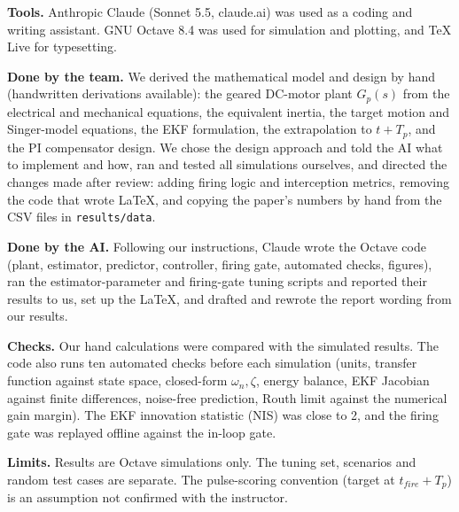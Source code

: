\small
\textbf{Tools.} Anthropic Claude (Sonnet 5.5, claude.ai) was used as a coding and writing assistant. GNU Octave 8.4 was used for simulation and plotting, and TeX Live for typesetting.

\textbf{Done by the team.} We derived the mathematical model and design by hand (handwritten derivations available): the geared DC-motor plant $G_p(s)$ from the electrical and mechanical equations, the equivalent inertia, the target motion and Singer-model equations, the EKF formulation, the extrapolation to $t+T_p$, and the PI compensator design. We chose the design approach and told the AI what to implement and how, ran and tested all simulations ourselves, and directed the changes made after review: adding firing logic and interception metrics, removing the code that wrote LaTeX, and copying the paper's numbers by hand from the CSV files in \texttt{results/data}.

\textbf{Done by the AI.} Following our instructions, Claude wrote the Octave code (plant, estimator, predictor, controller, firing gate, automated checks, figures), ran the estimator-parameter and firing-gate tuning scripts and reported their results to us, set up the LaTeX, and drafted and rewrote the report wording from our results.

\textbf{Checks.} Our hand calculations were compared with the simulated results. The code also runs ten automated checks before each simulation (units, transfer function against state space, closed-form $\omega_n,\zeta$, energy balance, EKF Jacobian against finite differences, noise-free prediction, Routh limit against the numerical gain margin). The EKF innovation statistic (NIS) was close to 2, and the firing gate was replayed offline against the in-loop gate.

\textbf{Limits.} Results are Octave simulations only. The tuning set, scenarios and random test cases are separate. The pulse-scoring convention (target at $t_{fire}+T_p$) is an assumption not confirmed with the instructor.
